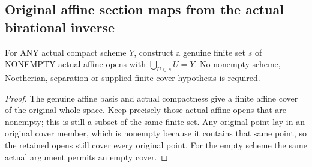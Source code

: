\subsection{Original affine section maps from the actual birational inverse}

\begin{lemma}
\label{scheme:actual-finite-nonempty-affine-cover}
\leanok
For ANY actual compact scheme $Y$, construct a genuine finite set $s$ of
NONEMPTY actual affine opens with $\bigcup_{U\in s}U=Y$.  No nonempty-scheme,
Noetherian, separation or supplied finite-cover hypothesis is required.
\end{lemma}
\begin{proof}
The genuine affine basis and actual compactness give a finite affine cover of
the original whole space.  Keep precisely those actual affine opens that are
nonempty; this is still a subset of the same finite set.  Any original point
lay in an original cover member, which is nonempty because it contains that
same point, so the retained opens still cover every original point.  For the
empty scheme the same actual argument permits an empty cover.
\end{proof}

